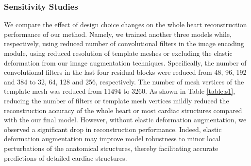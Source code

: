 \documentclass[times,review,preprint,authoryear]{elsarticle}
\begin{document}
\subsubsection{Sensitivity Studies}
We compare the effect of design choice changes on the whole heart reconstruction performance of our method. Namely, we trained another three models while, respectively, using reduced number of convolutional filters in the image encoding module, using reduced resolution of template meshes or excluding the elastic deformation from our image augmentation techniques. Specifically, the number of convolutional filters in the last four residual blocks were reduced from 48, 96, 192 and 384 to 32, 64, 128 and 256, respectively. The number of mesh vertices of the template mesh was reduced from 11494 to 3260. As shown in Table \ref{table:s1}, reducing the number of filters or template mesh vertices mildly reduced the reconstruction accuracy of the whole heart or most cardiac structures compared with the our final model.  However, without elastic deformation augmentation, we observed a significant drop in reconstruction performance. Indeed, elastic deformation augmentation may improve model robustness to minor local perturbations of the anatomical structures, thereby facilitating accurate predictions of detailed cardiac structures. 
\end{document}
